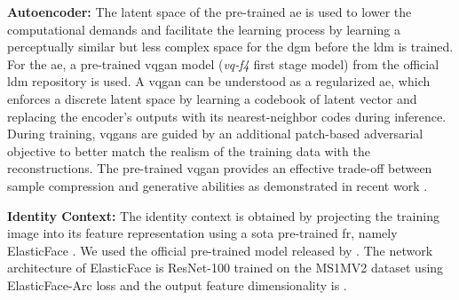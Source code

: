 \documentclass[10pt,twocolumn,letterpaper]{article}
\begin{document}
\textbf{Autoencoder:} The latent space of the pre-trained \acrshort{ae} is used to lower the computational demands and facilitate the learning process by learning a perceptually similar but less complex space for the \acrshort{dgm} before the \acrshort{ldm} is trained. For the \acrshort{ae}, a pre-trained \acrshort{vqgan} model (\textit{vq-f4} first stage model) from the official \acrshort{ldm} \cite{Rombach2021} repository is used. A \acrshort{vqgan} can be understood as a regularized \acrshort{ae}, which enforces a discrete latent space by learning a codebook of latent vector and replacing the encoder's outputs with its nearest-neighbor codes during inference. During training, \acrshort{vqgan}s are guided by an additional patch-based adversarial objective  to better match the realism of the training data with the reconstructions. The pre-trained \acrshort{vqgan} provides an effective trade-off between sample compression and generative abilities as demonstrated in recent work \cite{Rombach2021}. 


\textbf{Identity Context:} The identity context is obtained by projecting the training image into its feature representation using a \acrshort{sota} pre-trained \acrshort{fr}, namely ElasticFace \cite{ElasticFace}. We used the official pre-trained model released by \cite{ElasticFace}. 
The network architecture of ElasticFace \cite{ElasticFace} is ResNet-100 \cite{ResNet} trained on the MS1MV2 \cite{MSCeleb1MDataset,ArcFace} dataset using ElasticFace-Arc loss and the output feature dimensionality is .
\end{document}
